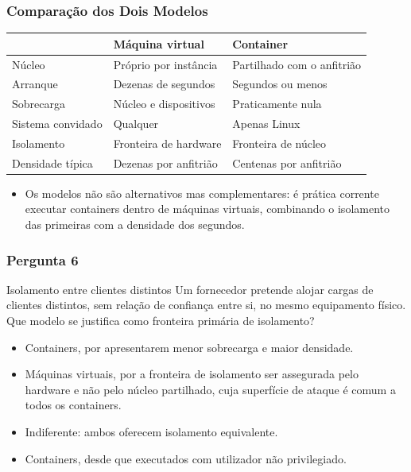 \documentclass[aspectratio=169]{beamer}
\begin{document}
\begin{frame}
\frametitle{Comparação dos Dois Modelos}
\vspace{0.1cm}
\begin{center}
\small
\begin{tabular}{@{}lll@{}}
\toprule
 & \textbf{Máquina virtual} & \textbf{Container} \\
\midrule
Núcleo            & Próprio por instância   & Partilhado com o anfitrião \\
Arranque          & Dezenas de segundos     & Segundos ou menos \\
Sobrecarga        & Núcleo e dispositivos   & Praticamente nula \\
Sistema convidado & Qualquer                & Apenas Linux \\
Isolamento        & Fronteira de hardware   & Fronteira de núcleo \\
Densidade típica  & Dezenas por anfitrião   & Centenas por anfitrião \\
\bottomrule
\end{tabular}
\end{center}
\vspace{0.25cm}
\begin{itemize}
    \setlength\itemsep{0.2cm}
    \item Os modelos não são alternativos mas complementares: é prática corrente executar containers dentro de máquinas virtuais, combinando o isolamento das primeiras com a densidade dos segundos.
\end{itemize}
\end{frame}

\begin{frame}
\frametitle{Pergunta 6}
\begin{pergunta}{Isolamento entre clientes distintos}
Um fornecedor pretende alojar cargas de clientes distintos, sem relação de confiança entre si, no mesmo equipamento físico. Que modelo se justifica como fronteira primária de isolamento?
\begin{itemize}
    \item[A)] Containers, por apresentarem menor sobrecarga e maior densidade.
    \item[B)] Máquinas virtuais, por a fronteira de isolamento ser assegurada pelo hardware e não pelo núcleo partilhado, cuja superfície de ataque é comum a todos os containers.
    \item[C)] Indiferente: ambos oferecem isolamento equivalente.
    \item[D)] Containers, desde que executados com utilizador não privilegiado.
\end{itemize}
\end{pergunta}
\end{frame}
\end{document}
